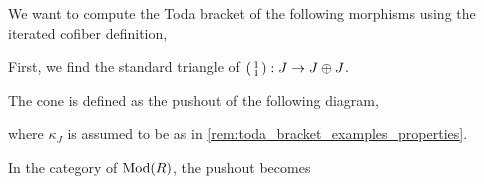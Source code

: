 \begin{example}
	We want to compute the Toda bracket of the following morphisms using the iterated cofiber definition,
	\begin{center}
	\end{center}

	First, we find the standard triangle of \( \begin{psmallmatrix} 1 \\ 1 \end{psmallmatrix}: J \to J \oplus J \).

	The cone is defined as the pushout of the following diagram,
	\begin{center}
	\end{center}
	where \( \kappa_J \) is assumed to be as in \autoref{rem:toda_bracket_examples_properties}.

	In the category of \( \operatorname{Mod}(R) \), the pushout becomes
	\begin{center}
\end{center}
\end{example}
